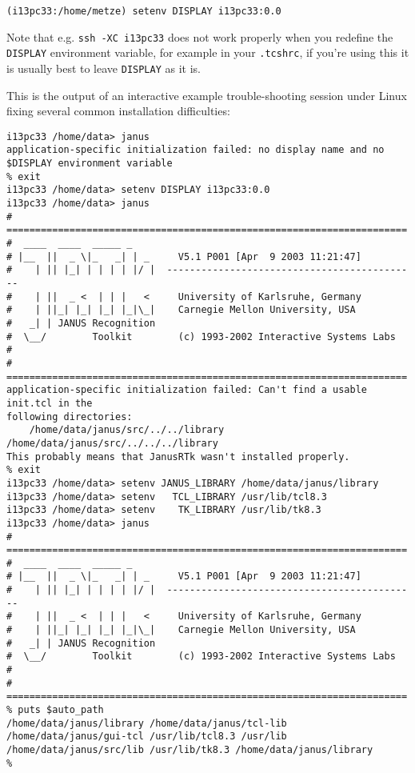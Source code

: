 \begin{verbatim}
(i13pc33:/home/metze) setenv DISPLAY i13pc33:0.0
\end{verbatim}

Note that e.g. \texttt{ssh -XC  i13pc33}  does not work properly  when
you redefine the \texttt{DISPLAY} environment variable, for example in
your  \texttt{.tcshrc},  if you're using this  it  is  usually best to
leave \texttt{DISPLAY} as it is.

This is the output of an interactive example trouble-shooting session
under Linux fixing several common installation difficulties:

\begin{verbatim}
i13pc33 /home/data> janus
application-specific initialization failed: no display name and no
$DISPLAY environment variable
% exit
i13pc33 /home/data> setenv DISPLAY i13pc33:0.0
i13pc33 /home/data> janus
# ======================================================================
#  ____  ____  _____ _
# |__  ||  _ \|_   _| | _     V5.1 P001 [Apr  9 2003 11:21:47]
#    | || |_| | | | | |/ |  --------------------------------------------
#    | ||  _ <  | | |   <     University of Karlsruhe, Germany
#    | ||_| |_| |_| |_|\_|    Carnegie Mellon University, USA
#   _| | JANUS Recognition
#  \__/        Toolkit        (c) 1993-2002 Interactive Systems Labs
#
# ======================================================================
application-specific initialization failed: Can't find a usable init.tcl in the
following directories:
    /home/data/janus/src/../../library /home/data/janus/src/../../../library
This probably means that JanusRTk wasn't installed properly.
% exit
i13pc33 /home/data> setenv JANUS_LIBRARY /home/data/janus/library
i13pc33 /home/data> setenv   TCL_LIBRARY /usr/lib/tcl8.3
i13pc33 /home/data> setenv    TK_LIBRARY /usr/lib/tk8.3
i13pc33 /home/data> janus
# ======================================================================
#  ____  ____  _____ _
# |__  ||  _ \|_   _| | _     V5.1 P001 [Apr  9 2003 11:21:47]
#    | || |_| | | | | |/ |  --------------------------------------------
#    | ||  _ <  | | |   <     University of Karlsruhe, Germany
#    | ||_| |_| |_| |_|\_|    Carnegie Mellon University, USA
#   _| | JANUS Recognition
#  \__/        Toolkit        (c) 1993-2002 Interactive Systems Labs
#
# ======================================================================
% puts $auto_path
/home/data/janus/library /home/data/janus/tcl-lib
/home/data/janus/gui-tcl /usr/lib/tcl8.3 /usr/lib
/home/data/janus/src/lib /usr/lib/tk8.3 /home/data/janus/library
% 
\end{verbatim}

